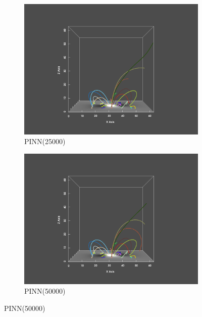 \begin{figure}
  \begin{subfigure}{.5\linewidth}
    \centering
    \caption{PINN(25000)}
    \includegraphics[trim={6cm 1cm 6cm 2cm}, clip, width=\linewidth]{"img/PINN_025000_xz.pdf"}
  \end{subfigure}%
  \begin{subfigure}{.5\linewidth}
    \centering
    \caption{PINN(50000)}
    \includegraphics[trim={6cm 1cm 6cm 2cm}, clip, width=\linewidth]{"img/PINN_050000_xz.pdf"}
  \end{subfigure}
  

\end{figure}
